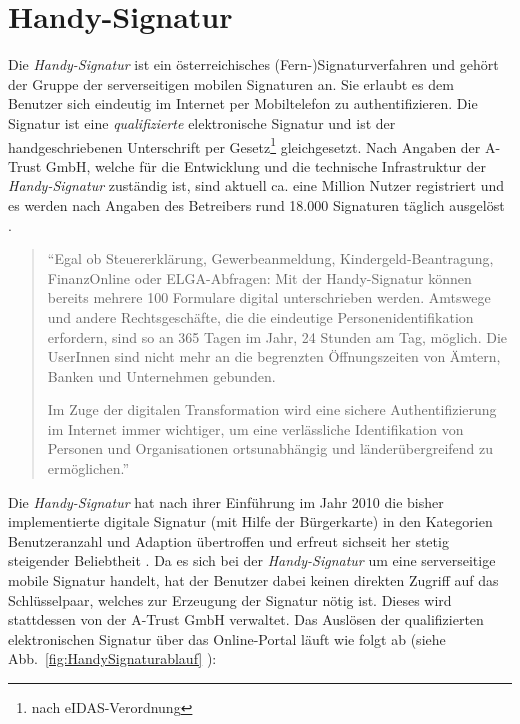 \documentclass[11pt,a4paper,ngerman]{scrreprt}
\begin{document}
\section{Handy-Signatur}\label{sec:HandySignatur}
Die \textit{Handy-Signatur} ist ein österreichisches (Fern-)Signaturverfahren und gehört der Gruppe der serverseitigen mobilen Signaturen an. Sie erlaubt es dem Benutzer sich eindeutig im Internet per Mobiltelefon zu authentifizieren. Die Signatur ist eine \emph{qualifizierte} elektronische Signatur und ist der handgeschriebenen Unterschrift per Gesetz\footnote{nach eIDAS-Verordnung} gleichgesetzt. Nach Angaben der A-Trust GmbH, welche für die Entwicklung und die technische Infrastruktur der \textit{Handy-Signatur} zuständig ist, sind aktuell ca. eine Million Nutzer registriert und es werden nach Angaben des Betreibers rund 18.000 Signaturen täglich ausgelöst \cite{atrustHSig}.
\begin{quote}
    ``Egal ob Steuererklärung, Gewerbeanmeldung, Kindergeld-Beantragung, FinanzOnline oder ELGA-Abfragen: Mit der Handy-Signatur können bereits mehrere 100 Formulare digital unterschrieben werden. Amtswege und andere Rechtsgeschäfte, die die eindeutige Personenidentifikation erfordern, sind so an 365 Tagen im Jahr, 24 Stunden am Tag, möglich. Die UserInnen sind nicht mehr an die begrenzten Öffnungszeiten von Ämtern, Banken und Unternehmen gebunden.

    Im Zuge der digitalen Transformation wird eine sichere Authentifizierung im Internet immer wichtiger, um eine verlässliche Identifikation von Personen und Organisationen ortsunabhängig und länderübergreifend zu ermöglichen.'' \cite{atrustHSig}
\end{quote}
Die \textit{Handy-Signatur} hat nach ihrer Einführung im Jahr 2010 die bisher implementierte digitale Signatur (mit Hilfe der Bürgerkarte) in den Kategorien Benutzeranzahl und Adaption übertroffen und erfreut sichseit her stetig steigender Beliebtheit \cite[S.\,219, Abb.\,1]{scWorkshop}. Da es sich bei der \textit{Handy-Signatur} um eine serverseitige mobile Signatur handelt, hat der Benutzer dabei keinen direkten Zugriff auf das Schlüsselpaar, welches zur Erzeugung der Signatur nötig ist. Dieses wird stattdessen von der A-Trust GmbH verwaltet. Das Auslösen der qualifizierten elektronischen Signatur über das Online-Portal läuft wie folgt ab (siehe Abb.~\ref{fig:HandySignaturablauf} \cite[S.~3]{mobQes}):
\end{document}
